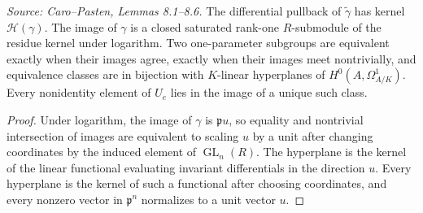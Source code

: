 \begin{lemma}
  \label{lem:cp_one_parameter_hyperplanes}
  \textit{Source: Caro--Pasten, Lemmas 8.1--8.6.}
  The differential pullback of \(\widetilde\gamma\) has kernel
  \(\mathcal H(\gamma)\).  The image of \(\gamma\) is a closed saturated
  rank-one \(R\)-submodule of the residue kernel under logarithm.  Two
  one-parameter subgroups are equivalent exactly when their images agree,
  exactly when their images meet nontrivially, and equivalence classes are in
  bijection with \(K\)-linear hyperplanes of \(H^0(A,\Omega^1_{A/K})\).
  Every nonidentity element of \(U_e\) lies in the image of a unique such class.
\end{lemma}
\begin{proof}
  Under logarithm, the image of \(\gamma\) is \(\mathfrak p u\), so equality
  and nontrivial intersection of images are equivalent to scaling \(u\) by a
  unit after changing coordinates by the induced element of \(\operatorname{GL}_n(R)\).
  The hyperplane is the kernel of the linear functional evaluating invariant
  differentials in the direction \(u\).  Every hyperplane is the kernel of such
  a functional after choosing coordinates, and every nonzero vector in
  \(\mathfrak p^n\) normalizes to a unit vector \(u\).
\end{proof}

